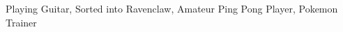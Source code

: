 

\begin{cvskills}

  \cvinterest
    {}
    {Playing Guitar, Sorted into Ravenclaw, Amateur Ping Pong Player, Pokemon Trainer} 
\end{cvskills}
